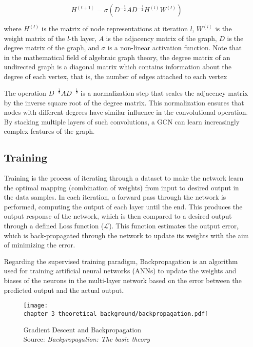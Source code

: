 \begin{equation}
H^{(l+1)} = \sigma(D^{-\frac{1}{2}} A D^{-\frac{1}{2}} H^{(l)} W^{(l)})
\end{equation}

where $H^{(l)}$ is the matrix of node representations at iteration $l$, $W^{(l)}$ is the weight matrix of the $l$-th layer, $A$ is the adjacency matrix of the graph, $D$ is the degree matrix of the graph, and $\sigma$ is a non-linear activation function. Note that in the mathematical field of algebraic graph theory, the degree matrix of an undirected graph is a diagonal matrix which contains information about the degree of each vertex, that is, the number of edges attached to each vertex

The operation $D^{-\frac{1}{2}} A D^{-\frac{1}{2}}$ is a normalization step that scales the adjacency matrix by the inverse square root of the degree matrix. This normalization ensures that nodes with different degrees have similar influence in the convolutional operation. By stacking multiple layers of such convolutions, a GCN can learn increasingly complex features of the graph.

\subsection{Training}
\label{subsec:3_training}

Training is the process of iterating through a dataset to make the network learn the optimal mapping (combination of weights) from input to desired output in the data samples. In each iteration, a forward pass through the network is performed, computing the output of each layer until the end. This produces the output response of the network, which is then compared to a desired output through a defined Loss function ($\mathcal{L}$). This function estimates the output error, which is back-propagated through the network to update its weights with the aim of minimizing the error. 

Regarding the supervised training paradigm, Backpropagation \cite{rumelhart1995backpropagation} is an algorithm used for training artificial neural networks (ANNs) to update the weights and biases of the neurons in the multi-layer network based on the error between the predicted output and the actual output.

\begin{figure}[h]
	\centering
	\texttt{[image: chapter\_3\_theoretical\_background/backpropagation.pdf]}
	\caption[Gradient Descent and Backpropagation]{Gradient Descent and Backpropagation \\ 
	Source: \textit{Backpropagation: The basic theory} \cite{rumelhart1995backpropagation}}
	\label{fig:chapter_3_theoretical_background/backpropagation}
\end{figure}

